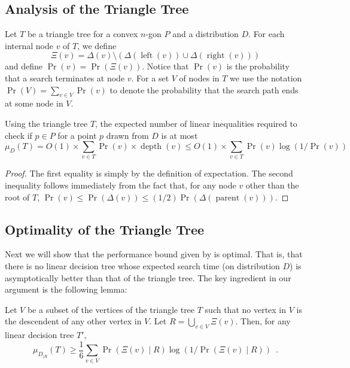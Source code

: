 \documentclass[charterfonts,lotsofwhite]{patmorin}
\DeclareMathOperator{\depth}{depth}
\DeclareMathOperator{\lft}{left}
\DeclareMathOperator{\rght}{right}
\DeclareMathOperator{\prnt}{parent}
\begin{document}
\subsection{Analysis of the Triangle Tree}

Let $T$ be a triangle tree for a convex $n$-gon $P$ and a distribution
$D$.  For each internal node $v$ of $T$, we define
\[
   \Xi(v)=\Delta(v)\setminus (\Delta(\lft(v))\cup \Delta(\rght(v)))
\]
and define $\Pr(v)=\Pr(\Xi(v))$.  Notice that $\Pr(v)$ is the
probability that a search terminates at node $v$.  For a set $V$ of
nodes in $T$ we use the notation $\Pr(V)=\sum_{v\in V}\Pr(v)$ to
denote the probability that the search path ends at some node in $V$.

\begin{thm}
Using the triangle tree $T$, the expected number of linear inequalities
required to check if $p\in P$ for a point $p$ drawn from $D$ is at
most
\[
     \mu_D(T) = O(1)\times \sum_{v\in T}\Pr(v)\times\depth (v)
      \le O(1)\times \sum_{v\in T}\Pr(v)\log(1/\Pr(v))
\]
\end{thm}

\begin{proof}
The first equality is simply by the definition of expectation.  The
second inequality follows immediately from the fact that, for any node
$v$ other than the root of $T$, $\Pr(v)\le \Pr(\Delta(v))\le
(1/2)\Pr(\Delta(\prnt(v)))$.
\end{proof}


\subsection{Optimality of the Triangle Tree}

Next we will show that the performance bound given by
 is optimal.  That is, that there is no linear
decision tree whose expected search time (on distribution $D$) is
asymptotically better than that of the triangle tree.
The key ingredient in our argument is the following lemma:

\begin{lem}
Let $V$ be a subset of the vertices of the triangle tree $T$ such that
no vertex in $V$ is the descendent of any other vertex in $V$.  
Let $R=\bigcup_{v\in V} \Xi(v)$. Then, for any linear decision
tree $T'$,
\[
    \mu_{D_{|R}}(T) 
	\ge \frac{1}{6}\sum_{v\in V}\Pr(\Xi(v)\mid
R)\log(1/\Pr(\Xi(v)\mid R)) \enspace .
\]
\end{lem}
\end{document}

